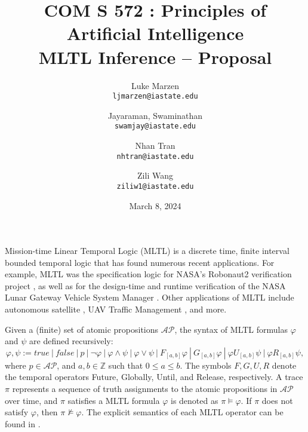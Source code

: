 \documentclass[12pt]{article}
\renewcommand{\phi}{\varphi}
\begin{document}
\title{\bf
\large COM S 572 : Principles of Artificial Intelligence \\
\large MLTL Inference -- Proposal}

\author{
  Luke Marzen\\
  \texttt{ljmarzen@iastate.edu}
  \and
  Jayaraman, Swaminathan\\
  \texttt{swamjay@iastate.edu}
  \and
  Nhan Tran\\
  \texttt{nhtran@iastate.edu}
  \and
  Zili Wang\\
  \texttt{ziliw1@iastate.edu}
}

\date{March 8, 2024}

\maketitle


Mission-time Linear Temporal Logic (MLTL) is a discrete time, finite interval bounded temporal logic that has found numerous recent applications. 
For example, MLTL was the specification logic for NASA's Robonaut2 verification project \cite{KZJZR20}, as well as for the design-time and runtime verification of the NASA Lunar Gateway Vehicle System Manager \cite{DBR21}.
Other applications of MLTL include autonomous satellite \cite{JAXA}, UAV Traffic Management \cite{HCHJR21}, and more. 

Given a (finite) set of atomic propositions $\mathcal{AP}$, the syntax of MLTL formulas $\phi$ and $\psi$ are defined recursively: 
$$ \phi, \psi := true \ | \ false \ | \ p \ | \ \neg \phi \ | \ \phi \land \psi \ | \ \phi \lor \psi \ | \ F_{[a,b]} \phi \ | \ G_{[a,b]} \phi \ | \ \phi U_{[a,b]} \psi \ | \ \phi R_{[a,b]} \psi, $$
where $p \in \mathcal{AP}$, and $a, b \in \mathbb{Z}$ such that $0 \leq a \leq b$. 
The symbols $F, G, U, R$ denote the temporal operators Future, Globally, Until, and Release, respectively.
A trace $\pi$ represents a sequence of truth assignments to the atomic propositions in $\mathcal{AP}$ over time, and $\pi$ satisfies a MLTL formula $\phi$ is denoted as $\pi \models \phi$.
If $\pi$ does not satisfy $\phi$, then $\pi \not\models \phi$.
The explicit semantics of each MLTL operator can be found in \cite{WEST-iFM23}.
\end{document}
